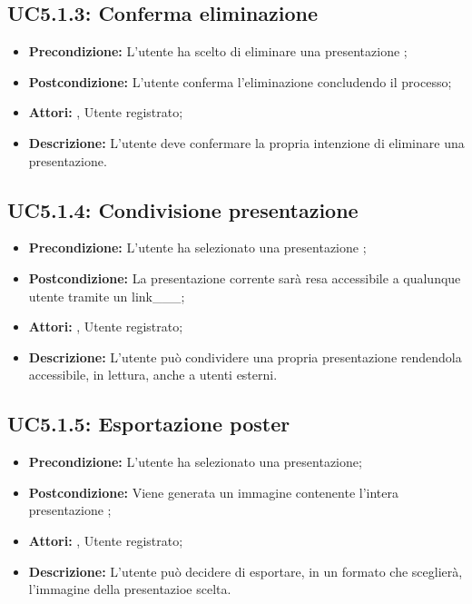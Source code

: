 \subsection{ UC5.1.3: Conferma eliminazione }

\begin{itemize}
	\item \textbf{Precondizione:} L'utente ha scelto di eliminare una presentazione ;
	\item \textbf{Postcondizione:} L'utente conferma l'eliminazione concludendo il processo;
	\item \textbf{Attori:} , Utente registrato;
	\item \textbf{Descrizione:} L'utente deve confermare la propria intenzione di eliminare una presentazione.
\end{itemize}
\subsection{ UC5.1.4: Condivisione presentazione }

\begin{itemize}
	\item \textbf{Precondizione:} L'utente ha selezionato una presentazione ;
	\item \textbf{Postcondizione:} La presentazione corrente sarà resa accessibile a qualunque utente tramite un link___;
	\item \textbf{Attori:} , Utente registrato;
	\item \textbf{Descrizione:} L'utente può condividere una propria presentazione rendendola accessibile, in lettura, anche a utenti esterni.
\end{itemize}
\subsection{ UC5.1.5: Esportazione poster}

\begin{itemize}
	\item \textbf{Precondizione:} L'utente ha selezionato una presentazione;
	\item \textbf{Postcondizione:} Viene generata un immagine contenente l'intera presentazione ;
	\item \textbf{Attori:} , Utente registrato;
	\item \textbf{Descrizione:} L'utente può decidere di esportare, in un formato che sceglierà, l'immagine della presentazioe scelta.
\end{itemize}
